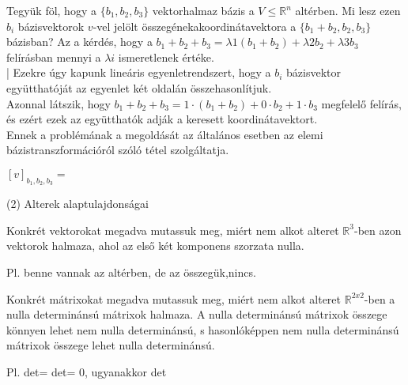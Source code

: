 \begin{frame}
  \begin{tcolorbox}[title={1/4. -Q-}]
      Tegyük föl, hogy a $\{b_1,b_2,b_3\}$ vektorhalmaz bázis a $V \leq \mathbb{R}^n$ altérben. Mi lesz ezen $b_i$ bázisvektorok $v$-vel jelölt összegénekakoordinátavektora a $\{b_1+b_2,b_2,b_3\}$ bázisban?
  \tcblower
    Az a kérdés, hogy a $b_1+b_2+b_3 = {\lambda}1(b_1+b_2)+{\lambda}2b_2+{\lambda}3b_3$ felírásban mennyi a ${\lambda}i$ ismeretlenek értéke.\\|
      Ezekre úgy kapunk lineáris egyenletrendszert, hogy a $b_i$ bázisvektor együtthatóját az egyenlet két oldalán összehasonlítjuk.\\
      
      Azonnal látszik, hogy $b_1 + b_2 + b_3 = 1 \cdot (b_1 + b_2) + 0 \cdot b_2 + 1 \cdot b_3$ megfelelő felírás, és ezért ezek az együtthatók adják a keresett koordinátavektort.\\
      
      Ennek a problémának a megoldását az általános esetben az elemi bázistranszformációról szóló tétel szolgáltatja.
      
   $[v]_{b_1,b_2,b_3} =$ 
  \end{tcolorbox}
\end{frame}  

\begin{frame}[plain]
\begin{tcolorbox}[center, colback={myyellow}, coltext={black}, colframe={myyellow}]
    {\RHuge  (2) Alterek alaptulajdonságai}
    \mmedskip
\end{tcolorbox}
\end{frame}

\begin{frame}
  \begin{tcolorbox}[title={2/1. -R-}]
      Konkrét vektorokat megadva mutassuk meg, miért nem alkot alteret $\mathbb{R}^3$-ben azon vektorok halmaza, ahol az első két komponens szorzata nulla. 
  \tcblower

    \mmedskip 
  
   Pl. benne vannak az altérben, de az összegük,nincs.
  \end{tcolorbox}
\end{frame}


\begin{frame}
  \begin{tcolorbox}[title={2/2. -Q-}]
      Konkrét mátrixokat megadva mutassuk meg, miért nem alkot alteret $\mathbb{R}^{2 x 2}$-ben a nulla determinánsú mátrixok halmaza. 
  \tcblower
    A nulla determinánsú mátrixok összege könnyen lehet nem nulla determinánsú, s hasonlóképpen nem nulla determinánsú mátrixok összege lehet nulla determinánsú.\\
    \mmedskip 
  
    Pl. det= det= 0, ugyanakkor det
  \end{tcolorbox}
\end{frame}

